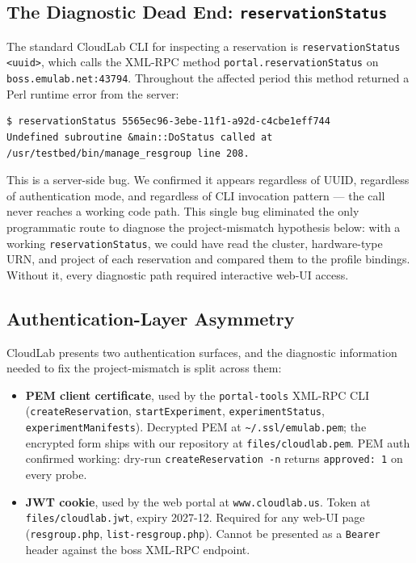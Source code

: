 \documentclass[11pt,a4paper]{article}
\begin{document}
\subsection{The Diagnostic Dead End: \texttt{reservationStatus}}
\label{sec:postmortem-resstatus}

The standard CloudLab CLI for inspecting a reservation is \texttt{reservationStatus <uuid>}, which calls the XML-RPC method \texttt{portal.reservationStatus} on \texttt{boss.emulab.net:43794}. Throughout the affected period this method returned a Perl runtime error from the server:

\begin{lstlisting}
$ reservationStatus 5565ec96-3ebe-11f1-a92d-c4cbe1eff744
Undefined subroutine &main::DoStatus called at
/usr/testbed/bin/manage_resgroup line 208.
\end{lstlisting}

This is a server-side bug. We confirmed it appears regardless of UUID, regardless of authentication mode, and regardless of CLI invocation pattern --- the call never reaches a working code path. This single bug eliminated the only programmatic route to diagnose the project-mismatch hypothesis below: with a working \texttt{reservationStatus}, we could have read the cluster, hardware-type URN, and project of each reservation and compared them to the profile bindings. Without it, every diagnostic path required interactive web-UI access.

\subsection{Authentication-Layer Asymmetry}

CloudLab presents two authentication surfaces, and the diagnostic information needed to fix the project-mismatch is split across them:

\begin{itemize}[nosep]
    \item \textbf{PEM client certificate}, used by the \texttt{portal-tools} XML-RPC CLI (\texttt{createReservation}, \texttt{startExperiment}, \texttt{experimentStatus}, \texttt{experimentManifests}). Decrypted PEM at \texttt{\textasciitilde/.ssl/emulab.pem}; the encrypted form ships with our repository at \texttt{files/cloudlab.pem}. PEM auth confirmed working: dry-run \texttt{createReservation -n} returns \texttt{approved: 1} on every probe.
    \item \textbf{JWT cookie}, used by the web portal at \texttt{www.cloudlab.us}. Token at \texttt{files/cloudlab.jwt}, expiry 2027-12. Required for any web-UI page (\texttt{resgroup.php}, \texttt{list-resgroup.php}). Cannot be presented as a \texttt{Bearer} header against the boss XML-RPC endpoint.
\end{itemize}
\end{document}
